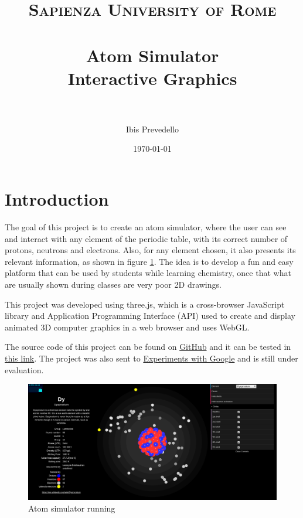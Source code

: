 \documentclass{article}
\title{
\normalfont \normalsize
\textsc{Sapienza University of Rome} \\ [25pt] %
\horrule{0.5pt} \\[0.4cm] %
\LARGE Atom Simulator \\ %
\large Interactive Graphics \\
\horrule{2pt} \\[0.5cm] %
}
\author{Ibis Prevedello} %
\date{\normalsize\today} %
\begin{document}
\sloppy %

\maketitle %


\section{Introduction}

The goal of this project is to create an atom simulator, where the user can see and interact with any element of the periodic table, with its correct number of protons, neutrons and electrons. Also, for any element chosen, it also presents its relevant information, as shown in figure \ref{fig:fig5}. The idea is to develop a fun and easy platform that can be used by students while learning chemistry, once that what are usually shown during classes are very poor 2D drawings.

This project was developed using three.js, which is a cross-browser JavaScript library and Application Programming Interface (API) used to create and display animated 3D computer graphics in a web browser and uses WebGL.

The source code of this project can be found on \href{https://github.com/ibiscp/Atom-Simulator}{GitHub} and it can be tested in \href{https://ibiscp.000webhostapp.com/atom.html}{this link}. The project was also sent to \href{https://experiments.withgoogle.com/}{Experiments with Google} and is still under evaluation.

\begin{figure}[!ht]
\centering
\includegraphics[scale=0.25]{screenshot.png}
\caption{Atom simulator running}
\label{fig:fig5}
\end{figure}
\end{document}
